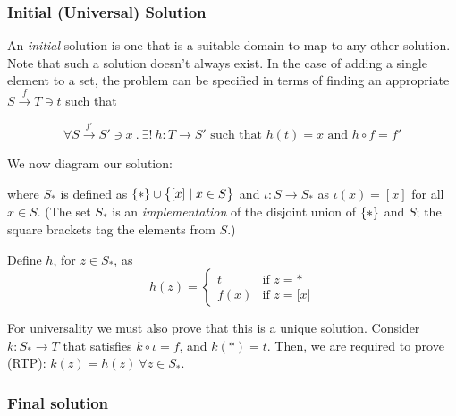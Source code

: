 \subsubsection*{Initial (Universal) Solution}

An \emph{initial} solution is one that is a suitable domain to map to any other
solution. Note that such a solution doesn't always exist. In the case of adding
a single element to a set, the problem can be specified in terms of finding an
appropriate $S \overset{f}{\rightarrow} T \ni t$ such that

\begin{equation*}
  \forall S \overset{f'}{\rightarrow} S' \ni x \ .\ 
  \exists!\ h : T \rightarrow S' \text{ such that }
  h(t) = x \text{ and }
  h \circ f = f'
\end{equation*}

We now diagram our solution:
\begin{center}
\end{center}

where $S_\ast$ is defined as 
$\{  \ast  \} \cup \big\{  \lbrack x\rbrack \mid x \in S  \big\}$
and $\iota: S \to S_\ast$ as $\iota(x)=[x]$ for all $x\in S$.  
%
(The set $S_\ast$ is an \emph{implementation} of the disjoint union of
$\{ * \}$ and $S$; the square brackets tag the elements from $S$.)

Define $h$, for $z\in S_\ast$, as
\begin{equation*}
    h(z) = \begin{cases}
        t & \text{if } z = \ast\\
        f(x) & \text{if } z = \lbrack x \rbrack 
    \end{cases}
\end{equation*}

For universality we must also prove that this is a unique solution.
Consider $k:S_\ast\to T$ that satisfies $k \circ \iota = f$, and 
$k(\ast) = t$. Then, we are required to prove (RTP):
$k(z) = h(z)\ \forall z \in S_\ast$.

\subsubsection*{Final solution}

